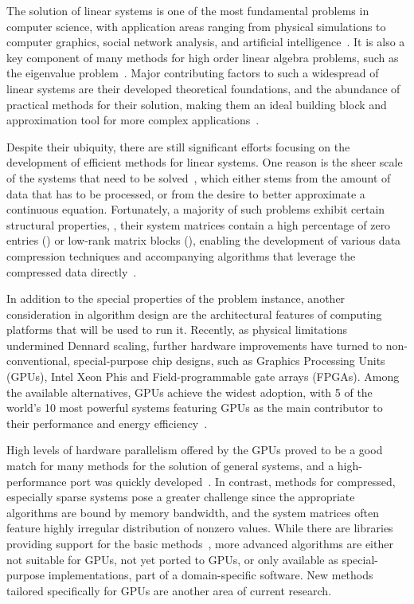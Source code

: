 The solution of linear systems is one of the most fundamental problems in
computer science, with application areas ranging from physical simulations to
computer graphics, social network analysis, and artificial
intelligence~\cite{saad,de-boor}. It is also a key component of many methods
for high order linear algebra problems, such as the eigenvalue
problem~\cite{demmel,feast}. Major contributing factors to such a widespread of
linear systems are their developed theoretical foundations, and the
abundance of practical methods for their solution, making them an ideal building
block and approximation tool for more complex applications~\cite{demmel,higham}.

Despite their ubiquity, there are still significant efforts focusing on the
development of efficient methods for linear systems. One reason is the sheer
scale of the systems that need to be solved~\cite{exascale-report}, which either
stems from the amount of data that has to be processed, or from the desire to
better approximate a continuous equation. Fortunately, a majority of such
problems exhibit certain structural properties, \eg, their system matrices
contain a high percentage of zero entries () or
low-rank matrix blocks (), enabling the
development of various data compression techniques and accompanying algorithms
that leverage the compressed data
directly~\cite{saad,duff,barrettemplates,hierarchical}.

In addition to the special properties of the problem instance, another
consideration in algorithm design are the architectural features of computing
platforms that will be used to run it. Recently, as physical limitations
undermined Dennard scaling, further hardware improvements have turned to
non-conventional, special-purpose chip designs, such as Graphics Processing
Units (GPUs), Intel Xeon Phis and Field-programmable gate arrays (FPGAs). Among
the available alternatives, GPUs achieve the widest adoption, with 5 of the
world's 10 most powerful systems featuring GPUs as the main contributor to their
performance and energy efficiency~\cite{top500}.

High levels of hardware parallelism offered by the GPUs proved to be a good
match for many methods for the solution of general systems, and a
high-performance port was quickly developed~\cite{magma}. In contrast,
methods for compressed, especially sparse systems pose a greater challenge since
the appropriate algorithms are bound by memory bandwidth, and the system
matrices often feature highly irregular distribution of nonzero values. While
there are libraries providing support for the basic
methods~\cite{magma,vienna-cl,paralution,ginkgo}, more advanced algorithms are
either not suitable for GPUs, not yet ported to GPUs, or only available as
special-purpose implementations, part of a domain-specific software. New methods
tailored specifically for GPUs are another area of current research.

